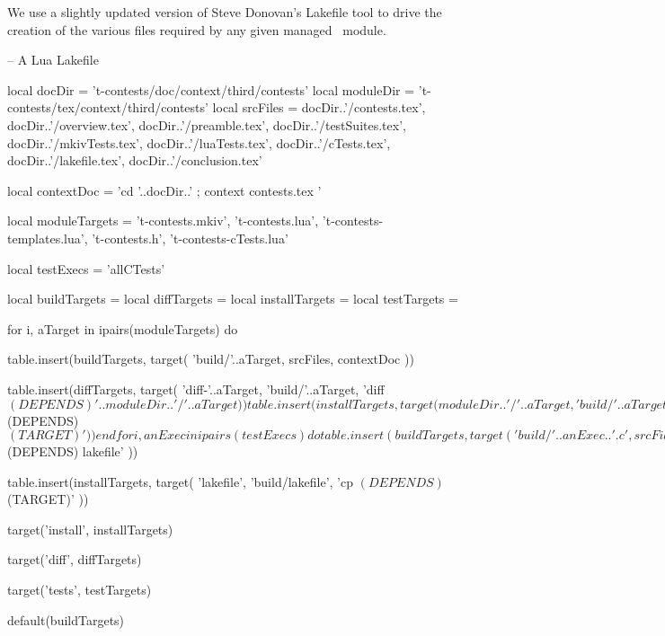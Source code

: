 
\startchapter[title=Lakefile]

We use a slightly updated version of Steve Donovan's Lakefile tool to 
drive the creation of the various files required by any given 
 managed \ConTeXt\ module. 

\startLakefile
-- A Lua Lakefile

local docDir    = 't-contests/doc/context/third/contests'
local moduleDir = 't-contests/tex/context/third/contests'
local srcFiles = {
  docDir..'/contests.tex',
  docDir..'/overview.tex',
  docDir..'/preamble.tex',
  docDir..'/testSuites.tex',
  docDir..'/mkivTests.tex',
  docDir..'/luaTests.tex',
  docDir..'/cTests.tex',
  docDir..'/lakefile.tex',
  docDir..'/conclusion.tex'
}

local contextDoc = 
  'cd '..docDir..' ; context contests.tex '

local moduleTargets = {
  't-contests.mkiv',
  't-contests.lua',
  't-contests-templates.lua',
  't-contests.h',
  't-contests-cTests.lua'
}

local testExecs = {
  'allCTests'
}

local buildTargets   = { }
local diffTargets    = { }
local installTargets = { }
local testTargets    = { }

for i, aTarget in ipairs(moduleTargets) do

  table.insert(buildTargets, target(
    'build/'..aTarget,
    srcFiles,
    contextDoc
  ))

  table.insert(diffTargets, target(
    'diff-'..aTarget,
    'build/'..aTarget,
    'diff $(DEPENDS) '..moduleDir..'/'..aTarget
  ))

  table.insert(installTargets, target(
    moduleDir..'/'..aTarget,
    'build/'..aTarget,
    'cp $(DEPENDS) $(TARGET)'
  ))
end

for i, anExec in ipairs(testExecs) do

  table.insert(buildTargets, target(
    'build/'..anExec..'.c',
    srcFiles,
    contextDoc
  ))

  c.program{
    'build/'..anExec,
    src=anExec..'.c',
    cdir='build',
    needs='lua5.2'
  }
  
  table.insert(testTargets, target(
    'build/'..anExec..'-results.lua',
    'build/'..anExec,
    './build/'..anExec
  ))
end

table.insert(buildTargets, target(
  'build/lakefile',
  srcFiles,
  contextDoc
))

table.insert(diffTargets, target(
  'diff-lakefile',
  'build/lakefile',
  'diff $(DEPENDS) lakefile'
))

table.insert(installTargets, target(
  'lakefile',
  'build/lakefile',
  'cp $(DEPENDS) $(TARGET)'
))

target('install', installTargets)

target('diff', diffTargets)

target('tests', testTargets)

default(buildTargets)
\stopLakefile

\stopchapter